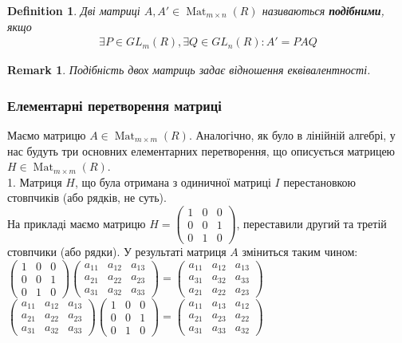 \documentclass[a4paper, 10pt]{article}
\theoremstyle{theoremdd}
\theoremstyle{theoremdd}
\newtheorem{definition}[theorem]{Definition}
\theoremstyle{theoremdd}
\theoremstyle{theoremdd}
\theoremstyle{theoremdd}
\theoremstyle{theoremdd}
\theoremstyle{theoremdd}
\theoremstyle{theoremdd}
\theoremstyle{theoremdd}
\theoremstyle{theoremdd}
\theoremstyle{theoremdd}
\newtheorem{remark}[theorem]{Remark}
\theoremstyle{theoremdd}
\theoremstyle{theoremdd}
\theoremstyle{theoremdd}
\theoremstyle{theoremdd}
\DeclareMathOperator{\Mat}{Mat}
\begin{document}
\begin{definition}
Дві матриці $A,A' \in \Mat_{m \times n}(R)$ називаються \textbf{подібними}, якщо
\begin{align*}
\exists P \in GL_m(R), \exists Q \in GL_n(R): A' = PAQ
\end{align*}
\end{definition}

\begin{remark}
Подібність двох матриць задає відношення еквівалентності.
\end{remark}

\subsubsection*{Елементарні перетворення матриці}
Маємо матрицю $A \in \Mat_{m \times m}(R)$. Аналогічно, як було в лінійній алгебрі, у нас будуть три основних елементарних перетворення, що описується матрицею $H \in \Mat_{m \times m}(R)$.\\
1. Матриця $H$, що була отримана з одиничної матриці $I$ перестановкою стовпчиків (або рядків, не суть).\\
На прикладі маємо матрицю $H = \begin{pmatrix}
1 & 0 & 0 \\
0 & 0 & 1 \\
0 & 1 & 0
\end{pmatrix}$, переставили другий та третій стовпчики (або рядки). У результаті матриця $A$ зміниться таким чином:\\
$\begin{pmatrix}
1 & 0 & 0 \\
0 & 0 & 1 \\
0 & 1 & 0
\end{pmatrix} \begin{pmatrix}
a_{11} & a_{12} & a_{13} \\
a_{21} & a_{22} & a_{23} \\
a_{31} & a_{32} & a_{33} 
\end{pmatrix} = \begin{pmatrix}
a_{11} & a_{12} & a_{13} \\
a_{31} & a_{32} & a_{33} \\
a_{21} & a_{22} & a_{23}
\end{pmatrix}$\\
$\begin{pmatrix}
a_{11} & a_{12} & a_{13} \\
a_{21} & a_{22} & a_{23} \\
a_{31} & a_{32} & a_{33} 
\end{pmatrix} \begin{pmatrix}
1 & 0 & 0 \\
0 & 0 & 1 \\
0 & 1 & 0
\end{pmatrix} = \begin{pmatrix}
a_{11} & a_{13} & a_{12} \\
a_{21} & a_{23} & a_{22} \\
a_{31} & a_{33} & a_{32}
\end{pmatrix}$
\end{document}
